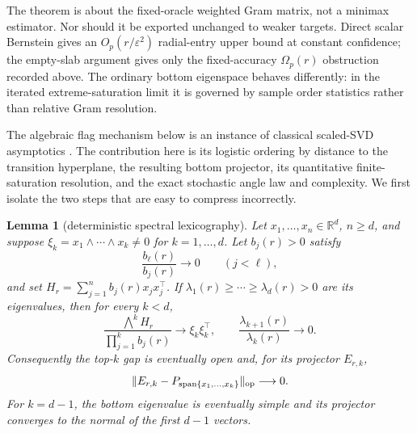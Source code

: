 \documentclass[11pt]{article}
\newtheorem{lemma}[theorem]{Lemma}
\newcommand{\R}{\mathbb R}
\begin{document}
The theorem is about the fixed-oracle weighted Gram matrix, not a minimax estimator.  Nor should it be exported
unchanged to weaker targets.  Direct scalar Bernstein gives an $O_p(r/\varepsilon^2)$ radial-entry upper bound at
constant confidence; the empty-slab argument gives only the fixed-accuracy $\Omega_p(r)$ obstruction recorded
above.  The ordinary bottom eigenspace behaves differently: in the iterated extreme-saturation limit it is governed
by sample order statistics rather than relative Gram resolution.

The algebraic flag mechanism below is an instance of classical scaled-SVD asymptotics
\cite{stewart1984}.  The contribution here is its logistic ordering by distance to the transition hyperplane, the
resulting bottom projector, its quantitative finite-saturation resolution, and the exact stochastic angle law and
complexity.  We first isolate the two steps that are easy to compress incorrectly.

\begin{lemma}[deterministic spectral lexicography]
\label{lem:deterministiclexicography}
Let $x_1,\ldots,x_n\in\R^d$, $n\ge d$, and suppose
$\xi_k=x_1\wedge\cdots\wedge x_k\ne0$ for $k=1,\ldots,d$.  Let $b_j(r)>0$ satisfy
\begin{equation}
 \frac{b_\ell(r)}{b_j(r)}\longrightarrow0\qquad(j<\ell),
 \label{eq:weighthierarchy}
\end{equation}
and set $H_r=\sum_{j=1}^n b_j(r)x_jx_j^\top$.  If
$\lambda_1(r)\ge\cdots\ge\lambda_d(r)>0$ are its eigenvalues, then for every $k<d$,
\begin{equation}
 \frac{\bigwedge^kH_r}{\prod_{j=1}^kb_j(r)}\longrightarrow\xi_k\xi_k^\top,
 \qquad \frac{\lambda_{k+1}(r)}{\lambda_k(r)}\longrightarrow0.
 \label{eq:exteriorrankonelimit}
\end{equation}
Consequently the top-$k$ gap is eventually open and, for its projector $E_{r,k}$,
\begin{equation}
 \lVert E_{r,k}-P_{\operatorname{span}\{x_1,\ldots,x_k\}}\rVert_{\rm op}\longrightarrow0.
 \label{eq:pluckerbackward}
\end{equation}
For $k=d-1$, the bottom eigenvalue is eventually simple and its projector converges to the normal of the first
$d-1$ vectors.
\end{lemma}
\end{document}
